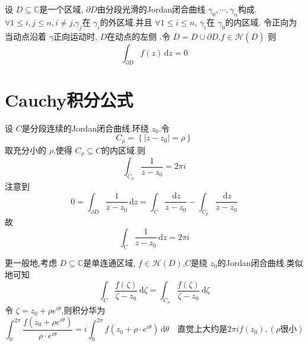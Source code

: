 \documentclass[../../复变函数.tex]{subfiles}
\begin{document}
\hspace*{\fill} 

\begin{theorem}
    设 \(  D\subseteq \mathbb{C}   \)是一个区域, \(   \partial D  \)由分段光滑的Jordan闭合曲线 \(   \gamma_0,\cdots,\gamma_{n}   \)构成.\(  \forall 1\le i,j\le n,i\neq j  \),\(   \gamma _{j}  \)在 \(   \gamma _{i}  \)的外区域.并且 \(  \forall 1\le i\le n  \), \(   \gamma _{i}  \)在 \(   \gamma _0   \)的内区域.  令正向为  当动点沿着 \(   \gamma   \)正向运动时, \(  D  \)在动点的左侧  .令 \(  \overline{D}= D\cup  \partial D  \),\(  f\in \mathcal{H}\left( \overline{D} \right)   \)   则 \[
    \int_{ \partial D}f\left( z \right)\,\mathrm{d} z= 0 
    \]    
\end{theorem}
\section{Cauchy积分公式}
设 \(  C  \)是分段连续的Jordan闭合曲线.环绕 \(  z_0  \).令 \[
C_{\rho }= \left\{ \left| z-z_0 \right|= \rho   \right\}
\]取充分小的 \(  \rho   \),使得 \(  C_{\rho }\subseteq C  \)的内区域.则 \[
\int_{C_{\rho }}\frac{1 }{z-z_0 }= 2\pi i  
\]    注意到 \[
0 =  \int_{ \partial D}\frac{1 }{z-z_0 }\,\mathrm{d} z= \int_{C}\frac{\,\mathrm{d} z }{z-z_0 }-\int_{C_{p}}\frac{\,\mathrm{d} z }{z-z_0 }   
\]故 \[
\int_{C}\frac{1 }{z-z_0 }\,\mathrm{d} z= 2\pi i 
\]


更一般地,考虑 \(  D\subseteq \mathbb{C}   \)是单连通区域, \(  f\in \mathcal{H}\left( D \right)   \),\(  C  \)是绕 \(  z_0  \)的Jordan闭合曲线.类似地可知 \[
\int_{C}\frac{f\left( \zeta  \right)  }{\zeta -z_0 }\,\mathrm{d} \zeta = \int_{C_{\rho }} \frac{f\left( \zeta  \right)  }{\zeta -z_0 }\,\mathrm{d} \zeta  
\]令 \(  \zeta = z_0+ \rho e^{i \theta }  \),则积分华为 \[
\int_{0}^{2\pi }\frac{f\left( z_0+ \rho e^{i \theta } \right)  }{\rho \cdot e^{i \theta } }= i\int_{0}^{2\pi }f\left( z_0+ \rho \cdot e^{i \theta } \right)\,\mathrm{d}  \theta \quad   \text{直觉上大约是} 2\pi if \left( z_0 \right),\left( \rho \text{很小} \right)  
\]    
\end{document}
